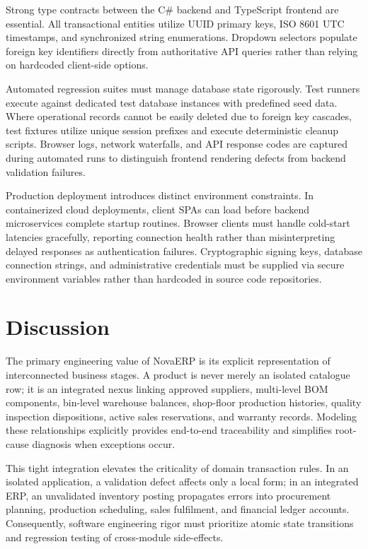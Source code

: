 \documentclass[conference]{IEEEtran}
\begin{document}
Strong type contracts between the C\# backend and TypeScript frontend are essential. All transactional entities utilize UUID primary keys, ISO 8601 UTC timestamps, and synchronized string enumerations. Dropdown selectors populate foreign key identifiers directly from authoritative API queries rather than relying on hardcoded client-side options.

Automated regression suites must manage database state rigorously. Test runners execute against dedicated test database instances with predefined seed data. Where operational records cannot be easily deleted due to foreign key cascades, test fixtures utilize unique session prefixes and execute deterministic cleanup scripts. Browser logs, network waterfalls, and API response codes are captured during automated runs to distinguish frontend rendering defects from backend validation failures.

Production deployment introduces distinct environment constraints. In containerized cloud deployments, client SPAs can load before backend microservices complete startup routines. Browser clients must handle cold-start latencies gracefully, reporting connection health rather than misinterpreting delayed responses as authentication failures. Cryptographic signing keys, database connection strings, and administrative credentials must be supplied via secure environment variables rather than hardcoded in source code repositories.

\section{Discussion}
The primary engineering value of NovaERP is its explicit representation of interconnected business stages. A product is never merely an isolated catalogue row; it is an integrated nexus linking approved suppliers, multi-level BOM components, bin-level warehouse balances, shop-floor production histories, quality inspection dispositions, active sales reservations, and warranty records. Modeling these relationships explicitly provides end-to-end traceability and simplifies root-cause diagnosis when exceptions occur.

This tight integration elevates the criticality of domain transaction rules. In an isolated application, a validation defect affects only a local form; in an integrated ERP, an unvalidated inventory posting propagates errors into procurement planning, production scheduling, sales fulfilment, and financial ledger accounts. Consequently, software engineering rigor must prioritize atomic state transitions and regression testing of cross-module side-effects.
\end{document}
